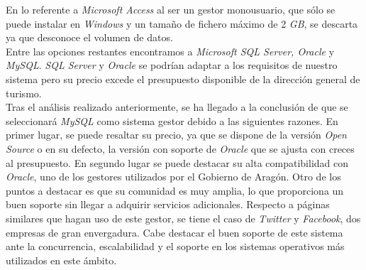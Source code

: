\documentclass[3pt]{article}
\begin{document}
En lo referente a \emph{Microsoft Access} al ser un gestor monousuario, que sólo se puede instalar en \emph{Windows} y un tamaño de fichero máximo de 2 \emph{GB}, se descarta ya que desconoce el volumen de datos.\\

Entre las opciones restantes encontramos a \emph{Microsoft SQL Server, Oracle} y \emph{MySQL}. \emph{SQL Server} y \emph{Oracle} se podrían adaptar a los requisitos de nuestro sistema pero su precio excede el presupuesto disponible de la dirección general de turismo.\\
Tras el análisis realizado anteriormente, se ha llegado a la conclusión de que se seleccionará \emph{MySQL} como sistema gestor debido a las siguientes razones. En primer lugar, se puede resaltar su precio, ya que se dispone de la versión \emph{Open Source} o en su defecto, la versión con soporte de \emph{Oracle} que se ajusta con creces al presupuesto. En segundo lugar se puede destacar su alta compatibilidad con \emph{Oracle}, uno de los gestores utilizados por el Gobierno de Aragón. Otro de los puntos a destacar es que su comunidad es muy amplia, lo que proporciona un buen soporte sin llegar a adquirir servicios adicionales. Respecto a páginas similares que hagan uso de este gestor, se tiene el caso de \emph{Twitter} y \emph{Facebook}, dos empresas de gran envergadura. Cabe destacar el buen soporte de este sistema ante la concurrencia, escalabilidad y el soporte en los sistemas operativos más utilizados en este ámbito. 

\newpage
{}

 
\end{document}
